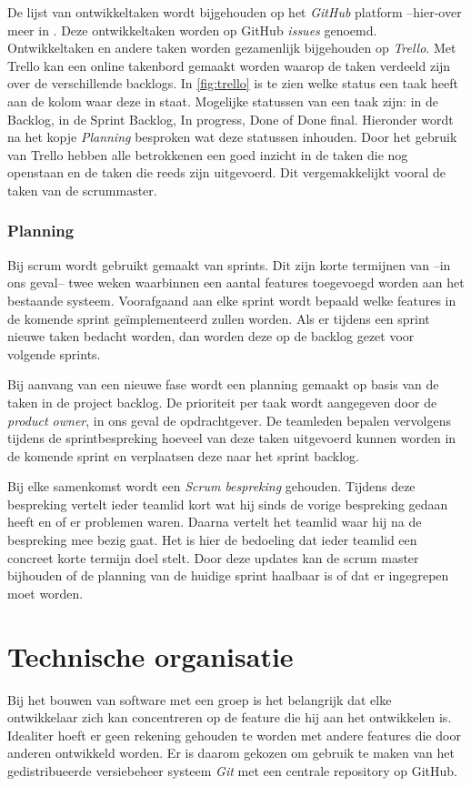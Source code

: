 De lijst van ontwikkeltaken wordt bijgehouden op het \emph{GitHub} platform --{hier-over} meer in . Deze ontwikkeltaken worden op GitHub \emph{issues} genoemd. Ontwikkeltaken en andere taken worden gezamenlijk bijgehouden op \emph{Trello}. Met Trello kan een online takenbord gemaakt worden waarop de taken verdeeld zijn over de verschillende backlogs. In \autoref{fig:trello} is te zien welke status een taak heeft aan de kolom waar deze in staat. Mogelijke statussen van een taak zijn: in de Backlog, in de Sprint Backlog, In progress, Done of Done final. Hieronder wordt na het kopje \emph{Planning} besproken wat deze statussen inhouden. Door het gebruik van Trello hebben alle betrokkenen een goed inzicht in de taken die nog openstaan en de taken die reeds zijn uitgevoerd. Dit vergemakkelijkt vooral de taken van de scrummaster.

\subsubsection{Planning}
Bij scrum wordt gebruikt gemaakt van sprints. Dit zijn korte termijnen van --in ons geval-- twee weken waarbinnen een aantal features toegevoegd worden aan het bestaande systeem. Voorafgaand aan elke sprint wordt bepaald welke features in de komende sprint geïmplementeerd zullen worden. Als er tijdens een sprint nieuwe taken bedacht worden, dan worden deze op de backlog gezet voor volgende sprints.

Bij aanvang van een nieuwe fase wordt een planning gemaakt op basis van de taken in de project backlog. De prioriteit per taak wordt aangegeven door de \emph{product owner}, in ons geval de opdrachtgever. De teamleden bepalen vervolgens tijdens de sprintbespreking hoeveel van deze taken uitgevoerd kunnen worden in de komende sprint en verplaatsen deze naar het sprint backlog.

Bij elke samenkomst wordt een \emph{Scrum bespreking} gehouden. Tijdens deze bespreking vertelt ieder teamlid kort wat hij sinds de vorige bespreking gedaan heeft en of er problemen waren. Daarna vertelt het teamlid waar hij na de bespreking mee bezig gaat. Het is hier de bedoeling dat ieder teamlid een concreet korte termijn doel stelt. Door deze updates kan de scrum master bijhouden of de planning van de huidige sprint haalbaar is of dat er ingegrepen moet worden.

\section{Technische organisatie} \label{sec:technische_organisatie}
Bij het bouwen van software met een groep is het belangrijk dat elke ontwikkelaar zich kan concentreren op de feature die hij aan het ontwikkelen is. Idealiter hoeft er geen rekening gehouden te worden met andere features die door anderen ontwikkeld worden. Er is daarom gekozen om gebruik te maken van het gedistribueerde versiebeheer systeem \emph{Git} met een centrale repository op GitHub.

